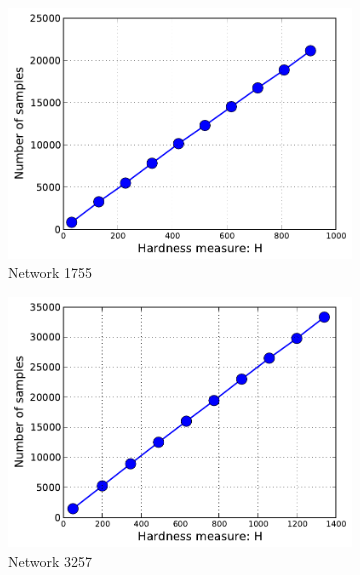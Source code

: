 \documentclass{article}
\begin{document}
\begin{figure}[ht]
\centering
\begin{subfigure}[c]{\imgsize\textwidth}
	\includegraphics[width=\textwidth]{fig/exp/mst-cs-1755}
	\caption{Network 1755}
\end{subfigure}
\begin{subfigure}[c]{\imgsize\textwidth}
	\includegraphics[width=\textwidth]{fig/exp/mst-cs-3257}
	\caption{Network 3257}
\end{subfigure}
\begin{subfigure}[c]{\imgsize\textwidth}

\end{subfigure}
\end{figure}
\end{document}
